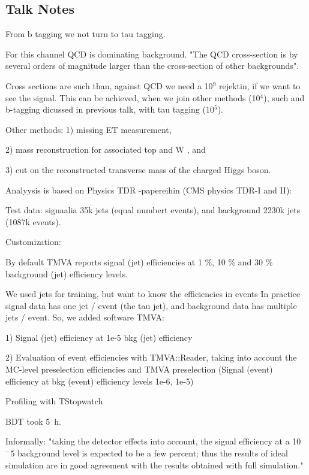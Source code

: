 \begin{appendix}
\section{Talk Notes}

From b tagging we not turn to tau tagging.

For this channel QCD is dominating background.
"The QCD cross-section is by several orders of 
magnitude larger than the cross-section of other backgrounds". 

Cross sections are such than, against QCD we need a 10$^9$ rejektin, if we want to see the  signal. 
This can be achieved, 
when we join other methods (10$^4$), such and b-tagging dicussed in previous talk, 
with tau tagging (10$^5$).

Other methods:
1) missing ET measurement, 

2) mass reconstruction for associated top and W , and 

3) cut on the reconstructed transverse mass of the charged Higgs boson.


Analyysis is based on Physics TDR -papereihin (CMS physics TDR-I and II):



Test data:
signaalia 35k jets (equal numbert events), and background 2230k jets (1087k events).


Customization:

By default TMVA reports signal (jet) efficiencies at 1 \%, 10 \% and 30 \% background
(jet) efficiency levels.

We used jets for training, but want to know the efficiencies in events
In practice signal data has one jet / event (the tau jet), and
background data has multiple jets / event.
So, we added software TMVA:

1) Signal (jet) efficiency at 1e-5 bkg (jet) efficiency

2) Evaluation of event efficiencies with TMVA::Reader, taking into account
   the MC-level preselection efficiencies and TMVA preselection
   (Signal (event) efficiency at bkg (event) efficiency levels 1e-6, 1e-5)

Profiling with TStopwatch 

BDT took 5~h.

Informally: 
"taking the detector effects into account, 
the signal efficiency at a 10$^-5$ background level is expected to be a few percent; 
thus the results of ideal simulation are in good agreement 
with the results obtained with full simulation."


\end{appendix}
